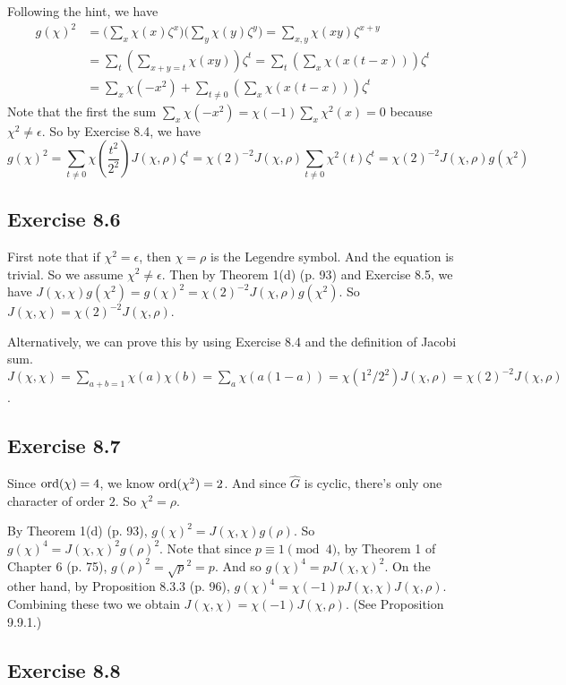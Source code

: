 \documentclass[../I&R.tex]{subfiles}
\begin{document}
Following the hint, we have
\begin{align*}
    g(\chi)^2 &= \Biggl(\sum_x \chi(x)\zeta^x\Biggr)\Biggl(\sum_y \chi(y)\zeta^y\Biggr) = \sum_{x,y} \chi(xy)\zeta^{x+y} \\
    &= \sum_t \left(\sum_{x+y=t} \chi(xy)\right)\zeta^t = \sum_t \left(\sum_x \chi(x(t-x))\right)\zeta^t \\
    &= \sum_x \chi(-x^2) + \sum_{t\neq0}\left(\sum_x \chi(x(t-x))\right)\zeta^t
\end{align*}
Note that the first the sum $\sum_x \chi(-x^2) = \chi(-1)\sum_x \chi^2(x) =0$ because $\chi^2\neq\epsilon$. So by Exercise 8.4, we have
$$g(\chi)^2 = \sum_{t\neq0} \chi\left(\frac{t^2}{2^2}\right)J(\chi,\rho)\zeta^t = \chi(2)^{-2}J(\chi,\rho) \sum_{t\neq0}\chi^2(t)\zeta^t = \chi(2)^{-2}J(\chi,\rho)g(\chi^2)$$

\subsection*{Exercise 8.6}

First note that if $\chi^2=\epsilon$, then $\chi=\rho$ is the Legendre symbol. And the equation is trivial. So we assume $\chi^2\neq\epsilon$. Then by Theorem 1(d) (p. 93) and Exercise 8.5, we have $J(\chi,\chi)g(\chi^2)=g(\chi)^2=\chi(2)^{-2}J(\chi,\rho)g(\chi^2)$. So $J(\chi,\chi)=\chi(2)^{-2}J(\chi,\rho)$.

Alternatively, we can prove this by using Exercise 8.4 and the definition of Jacobi sum. $J(\chi,\chi) = \sum_{a+b=1} \chi(a)\chi(b) = \sum_a \chi(a(1-a)) = \chi(1^2/2^2)J(\chi,\rho) = \chi(2)^{-2}J(\chi,\rho)$.

\subsection*{Exercise 8.7}

Since $\operatorname{ord}(\chi)=4$, we know $\operatorname{ord}(\chi^2)=2$. And since $\hat{G}$ is cyclic, there's only one character of order $2$. So $\chi^2=\rho$.

By Theorem 1(d) (p. 93), $g(\chi)^2=J(\chi,\chi)g(\rho)$. So $g(\chi)^4=J(\chi,\chi)^2g(\rho)^2$. Note that since $p\equiv1\pmod{4}$, by Theorem 1 of Chapter 6 (p. 75), $g(\rho)^2=\sqrt{p}^2=p$. And so $g(\chi)^4=pJ(\chi,\chi)^2$. On the other hand, by Proposition 8.3.3 (p. 96), $g(\chi)^4=\chi(-1)pJ(\chi,\chi)J(\chi,\rho)$. Combining these two we obtain $J(\chi,\chi)=\chi(-1)J(\chi,\rho)$. (See Proposition 9.9.1.)

\subsection*{Exercise 8.8}
\end{document}
